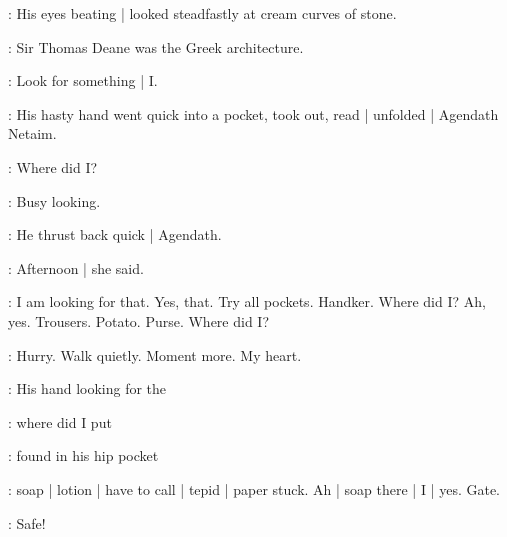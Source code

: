 :
His eyes beating |
looked steadfastly at cream curves of stone.

\BloomInt:
Sir Thomas Deane was the Greek architecture.


\BloomInt:
Look for something |
I.

:
His hasty hand went quick into a pocket,
took out,
read |
unfolded |
Agendath Netaim.

\BloomInt:
Where did I?

\BloomInt:
Busy looking.

:
He thrust back quick |
Agendath.

\BloomInt:
Afternoon |
she said.

\BloomInt:
I am looking for that.
Yes, that.
Try all pockets.
Handker.
Where did I?
Ah, yes.
Trousers.
Potato.
Purse.
Where did I?

\BloomInt:
Hurry.
Walk quietly.
Moment more.
My heart.

:
His hand looking for the

\BloomInt:
where did I put

:
found in his hip pocket

\BloomInt:
soap |
lotion |
have to call |
tepid |
paper stuck.
Ah |
soap there |
I |
yes.
Gate.

\BloomInt:
Safe!
